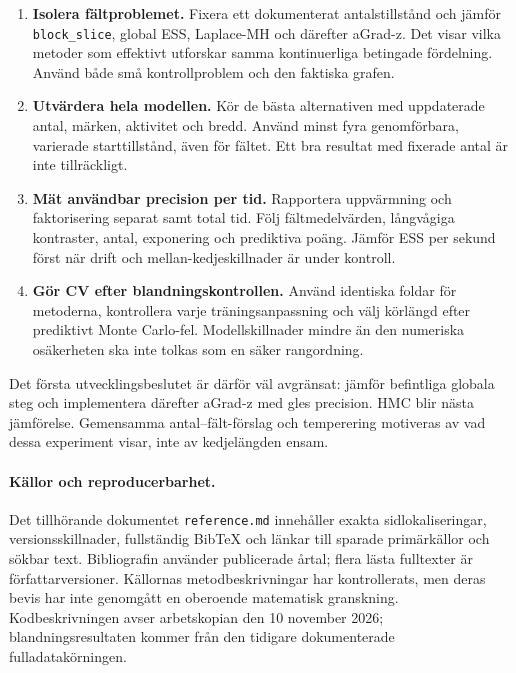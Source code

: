 \documentclass[11pt,a4paper]{article}
\begin{document}
\begin{enumerate}
\item \textbf{Isolera fältproblemet.} Fixera ett dokumenterat antalstillstånd och jämför \texttt{block\_slice}, global ESS, Laplace-MH och därefter aGrad-z. Det visar vilka metoder som effektivt utforskar samma kontinuerliga betingade fördelning. Använd både små kontrollproblem och den faktiska grafen.
\item \textbf{Utvärdera hela modellen.} Kör de bästa alternativen med uppdaterade antal, märken, aktivitet och bredd. Använd minst fyra genomförbara, varierade starttillstånd, även för fältet. Ett bra resultat med fixerade antal är inte tillräckligt.
\item \textbf{Mät användbar precision per tid.} Rapportera uppvärmning och faktorisering separat samt total tid. Följ fältmedelvärden, långvågiga kontraster, antal, exponering och prediktiva poäng. Jämför ESS per sekund först när drift och mellan-kedjeskillnader är under kontroll.
\item \textbf{Gör CV efter blandningskontrollen.} Använd identiska foldar för metoderna, kontrollera varje träningsanpassning och välj körlängd efter prediktivt Monte Carlo-fel. Modellskillnader mindre än den numeriska osäkerheten ska inte tolkas som en säker rangordning.
\end{enumerate}

Det första utvecklingsbeslutet är därför väl avgränsat: jämför befintliga globala steg och implementera därefter aGrad-z med gles precision. HMC blir nästa jämförelse. Gemensamma antal--fält-förslag och temperering motiveras av vad dessa experiment visar, inte av kedjelängden ensam.

\paragraph{Källor och reproducerbarhet.}
Det tillhörande dokumentet \texttt{reference.md} innehåller exakta sidlokaliseringar, versionsskillnader, fullständig BibTeX och länkar till sparade primärkällor och sökbar text. Bibliografin använder publicerade årtal; flera lästa fulltexter är författarversioner. Källornas metodbeskrivningar har kontrollerats, men deras bevis har inte genomgått en oberoende matematisk granskning. Kodbeskrivningen avser arbetskopian den 10 november 2026; blandningsresultaten kommer från den tidigare dokumenterade fulladatakörningen.

\clearpage
\small
\setlength{\bibsep}{4pt plus 1pt}


\end{document}
